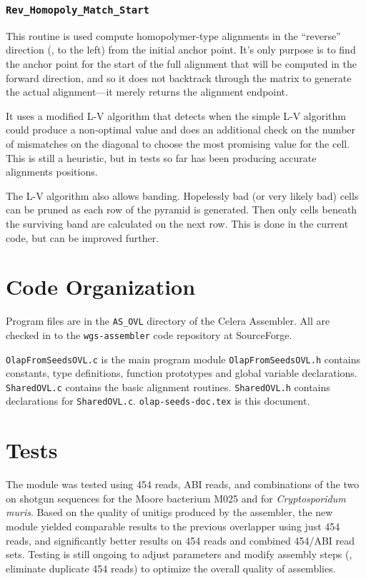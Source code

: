 \documentclass[letterpaper,11pt]{article}
\def\Pgm#1{\texttt{#1}}
\newenvironment{technotes}{\bq\small\bf\bi\exdent{Technical Notes:}}{\ei\eq}
\def\btn{\begin{technotes}}
\def\etn{\end{technotes}}
\begin{document}
\subsubsection{\Pgm{Rev\_Homopoly\_Match\_Start}}

This routine is used compute homopolymer-type alignments in
the ``reverse'' direction (\ie, to the left) from the initial
anchor point.  It's only purpose is to find the anchor point
for the start of the full alignment that will be computed in
the forward direction, and so it does not backtrack through the
matrix to generate the actual alignment---it merely returns
the alignment endpoint.

It uses a modified L-V algorithm
that detects when the simple L-V algorithm could produce a
non-optimal value and does an additional check on the number
of mismatches on the diagonal to choose the most promising value
for the cell.  This is still a heuristic, but in tests so far has
been producing accurate alignments positions.

\btn
\item
  The L-V algorithm also allows banding.  Hopelessly bad (or very
  likely bad) cells can be pruned as each row of the pyramid
  is generated.  Then only cells beneath the surviving band
  are calculated on the next row.  This is done in the current
  code, but can be improved further.
\etn


\section{Code Organization}

Program files are in the \Pgm{AS\_OVL} directory of the Celera
Assembler.  All are checked in to the \verb`wgs-assembler` code
repository at SourceForge.

\bi
\exdent
  \Pgm{OlapFromSeedsOVL.c} is the main program module
\exdent
  \Pgm{OlapFromSeedsOVL.h} contains constants, type definitions,
  function prototypes and global variable declarations.
\exdent
  \Pgm{SharedOVL.c} contains the basic alignment routines.
\exdent
  \Pgm{SharedOVL.h} contains declarations for \Pgm{SharedOVL.c}.
\exdent
  \Pgm{olap-seeds-doc.tex} is this document.
\ei


\section{Tests}

The module was tested using 454 reads, ABI reads, and combinations of
the two on shotgun sequences for the Moore bacterium M025 and for
\emph{Cryptosporidum muris}.  Based on the quality of unitigs
produced by the assembler, the new module yielded comparable results
to the previous overlapper using just 454 reads, and significantly
better results on 454 reads and combined 454/ABI read sets.  Testing
is still ongoing to adjust parameters and modify assembly steps (\eg,
eliminate duplicate 454 reads) to optimize the overall quality of
assemblies.
\end{document}
